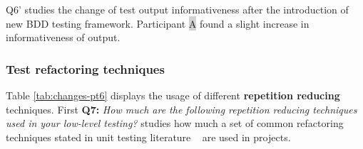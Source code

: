     \begin{table}[H]
            \caption {Low-level test output informativeness and changes in it} \label{tab:changes-pt5}
    \end{table}

Q6' studies the change of test output informativeness after the introduction of new BDD testing framework. Participant {\colorbox{lightgray}A}
found a slight increase in informativeness of output.

\clearpage
\subsubsection{Test refactoring techniques}

Table \ref{tab:changes-pt6} displays the usage of different \textbf{repetition reducing} techniques. First \textbf{Q7:}
\textit{How much are the following repetition reducing techniques used in your low-level testing?} studies how much a
set of common refactoring techniques stated in unit testing literature ~\cite{artofunit2013} are used in projects.

